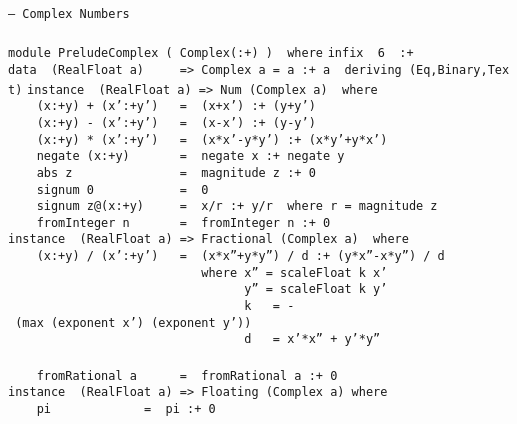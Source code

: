 \noindent\bprogB
\mbox{\tt --\ Complex\ Numbers}\\
\mbox{\tt }\\
\mbox{\tt module\ PreludeComplex\ (\ Complex(:+)\ )\ \ where}
\eprogB\noindent\bprogB
\mbox{\tt infix\ \ 6\ \ :+}
\eprogB\noindent\bprogB
\mbox{\tt data\ \ (RealFloat\ a)\ \ \ \ \ =>\ Complex\ a\ =\ a\ :+\ a\ \ deriving\ (Eq,Binary,Text)}
\eprogB\noindent\bprogB
\mbox{\tt instance\ \ (RealFloat\ a)\ =>\ Num\ (Complex\ a)\ \ where}\\
\mbox{\tt \ \ \ \ (x:+y)\ +\ (x':+y')\ \ \ =\ \ (x+x')\ :+\ (y+y')}\\
\mbox{\tt \ \ \ \ (x:+y)\ -\ (x':+y')\ \ \ =\ \ (x-x')\ :+\ (y-y')}\\
\mbox{\tt \ \ \ \ (x:+y)\ *\ (x':+y')\ \ \ =\ \ (x*x'-y*y')\ :+\ (x*y'+y*x')}\\
\mbox{\tt \ \ \ \ negate\ (x:+y)\ \ \ \ \ \ \ =\ \ negate\ x\ :+\ negate\ y}\\
\mbox{\tt \ \ \ \ abs\ z\ \ \ \ \ \ \ \ \ \ \ \ \ \ \ =\ \ magnitude\ z\ :+\ 0}\\
\mbox{\tt \ \ \ \ signum\ 0\ \ \ \ \ \ \ \ \ \ \ \ =\ \ 0}\\
\mbox{\tt \ \ \ \ signum\ z@(x:+y)\ \ \ \ \ =\ \ x/r\ :+\ y/r\ \ where\ r\ =\ magnitude\ z}\\
\mbox{\tt \ \ \ \ fromInteger\ n\ \ \ \ \ \ \ =\ \ fromInteger\ n\ :+\ 0}
\eprogB\noindent\bprogB
\mbox{\tt instance\ \ (RealFloat\ a)\ =>\ Fractional\ (Complex\ a)\ \ where}\\
\mbox{\tt \ \ \ \ (x:+y)\ /\ (x':+y')\ \ \ =\ \ (x*x''+y*y'')\ /\ d\ :+\ (y*x''-x*y'')\ /\ d}\\
\mbox{\tt \ \ \ \ \ \ \ \ \ \ \ \ \ \ \ \ \ \ \ \ \ \ \ \ \ \ \ where\ x''\ =\ scaleFloat\ k\ x'}\\
\mbox{\tt \ \ \ \ \ \ \ \ \ \ \ \ \ \ \ \ \ \ \ \ \ \ \ \ \ \ \ \ \ \ \ \ \ y''\ =\ scaleFloat\ k\ y'}\\
\mbox{\tt \ \ \ \ \ \ \ \ \ \ \ \ \ \ \ \ \ \ \ \ \ \ \ \ \ \ \ \ \ \ \ \ \ k\ \ \ =\ -\ (max\ (exponent\ x')\ (exponent\ y'))}\\
\mbox{\tt \ \ \ \ \ \ \ \ \ \ \ \ \ \ \ \ \ \ \ \ \ \ \ \ \ \ \ \ \ \ \ \ \ d\ \ \ =\ x'*x''\ +\ y'*y''}\\
\mbox{\tt }\\
\mbox{\tt \ \ \ \ fromRational\ a\ \ \ \ \ \ =\ \ fromRational\ a\ :+\ 0}
\eprogB\noindent\bprogB
\mbox{\tt instance\ \ (RealFloat\ a)\ =>\ Floating\ (Complex\ a)\ where}\\
\mbox{\tt \ \ \ \ pi\ \ \ \ \ \ \ \ \ \ \ \ \ =\ \ pi\ :+\ 0}\\
